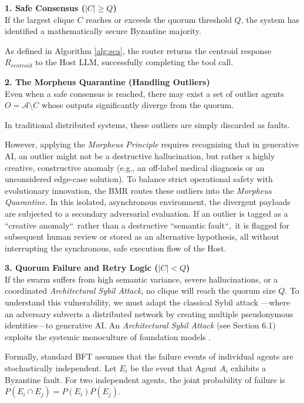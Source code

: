 \documentclass[a4paper,11pt,twocolumn]{article}
\theoremstyle{definition}
\theoremstyle{plain}
\begin{document}
\textbf{1. Safe Consensus ($|C| \ge Q$)} \\
If the largest clique $C$ reaches or exceeds the quorum threshold $Q$, the system has identified a mathematically secure Byzantine majority.

As defined in Algorithm \ref{alg:sca}, the router returns the centroid response $R_{centroid}$ to the Host LLM, successfully completing the tool call.

\pagebreak

\textbf{2. The Morpheus Quarantine (Handling Outliers)} \\
Even when a safe consensus is reached, there may exist a set of outlier agents $O = \mathcal{A} \setminus C$ whose outputs significantly diverge from the quorum.

In traditional distributed systems, these outliers are simply discarded as faults.


However, applying the \textit{Morpheus Principle} requires recognizing that in generative AI, an outlier might not be a destructive hallucination, but rather a highly creative, constructive anomaly (e.g., an off-label medical diagnosis or an unconsidered edge-case solution).
To balance strict operational safety with evolutionary innovation, the BMR routes these outliers into the \textit{Morpheus Quarantine}. In this isolated, asynchronous environment, the divergent payloads are subjected to a secondary adversarial evaluation.
If an outlier is tagged as a “creative anomaly“\ rather than a destructive “semantic fault“,\ it is flagged for subsequent human review or stored as an alternative hypothesis, all without interrupting the synchronous, safe execution flow of the Host.

\textbf{3. Quorum Failure and Retry Logic ($|C| < Q$)} \\
If the swarm suffers from high semantic variance, severe hallucinations, or a coordinated \textit{Architectural Sybil Attack}, no clique will reach the quorum size $Q$. 
To understand this vulnerability, we must adapt the classical Sybil attack \cite{douceur2002sybil}---where an adversary subverts a distributed network by creating multiple pseudonymous identities---to generative AI. An \textit{Architectural Sybil Attack} (see Section 6.1) exploits the systemic monoculture of foundation models \cite{bommasani2021opportunities}. 

Formally, standard BFT assumes that the failure events of individual agents are stochastically independent. Let $E_i$ be the event that Agent $A_i$ exhibits a Byzantine fault. For two independent agents, the joint probability of failure is $P(E_i \cap E_j) = P(E_i)P(E_j)$.
\end{document}
